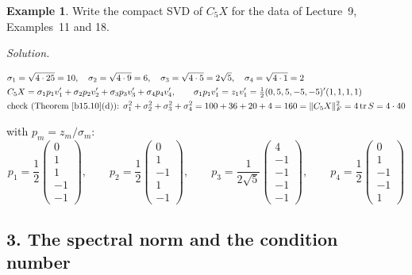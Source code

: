 \documentclass[12pt]{article}
\DeclareMathOperator{\tr}{tr}
\theoremstyle{definition}
\newtheorem{example}[theorem]{Example}
\newcommand{\lec}[1]{Lecture~#1}
\newcommand{\boardtop}{\vspace*{-\abovedisplayskip}}
\begin{document}
\begin{example}\label{b15.20}
Write the compact SVD of \(C_5X\) for the data of \lec{9}, Examples~11 and 18.
\end{example}
\textit{Solution.}
\begin{board}[Proposition~\ref{b15.19}(b), \(n-1=4\); \(\lambda_m=25,9,5,1\), \(v_m=\frac12h_m\), \(z_m\) (\lec{9},
Example~18); \(r=4\) (\(\lambda_4=1>0\); \lec{9}, Theorem~16(a)):]
\boardtop
\begin{align*}
&\sigma_1=\sqrt{4\cdot25}=10,\quad\sigma_2=\sqrt{4\cdot9}=6,\quad\sigma_3=\sqrt{4\cdot5}=2\sqrt5,\quad\sigma_4=\sqrt{4\cdot1}=2\\
&C_5X=\sigma_1p_1v_1'+\sigma_2p_2v_2'+\sigma_3p_3v_3'+\sigma_4p_4v_4',\qquad
\sigma_1p_1v_1'=z_1v_1'=\tfrac12(0,5,5,-5,-5)'(1,1,1,1)\\
&\text{check (Theorem~\ref{b15.10}(d)): }\sigma_1^2+\sigma_2^2+\sigma_3^2+\sigma_4^2=100+36+20+4=160
=\lVert C_5X\rVert_F^2=4\tr S=4\cdot40
\end{align*}
\end{board}
with \(p_m=z_m/\sigma_m\):
\[
p_1=\frac12\begin{pmatrix}0\\1\\1\\-1\\-1\end{pmatrix},\qquad
p_2=\frac12\begin{pmatrix}0\\1\\-1\\1\\-1\end{pmatrix},\qquad
p_3=\frac1{2\sqrt5}\begin{pmatrix}4\\-1\\-1\\-1\\-1\end{pmatrix},\qquad
p_4=\frac12\begin{pmatrix}0\\1\\-1\\-1\\1\end{pmatrix}
\]

\subsection*{3. The spectral norm and the condition number}
\end{document}
